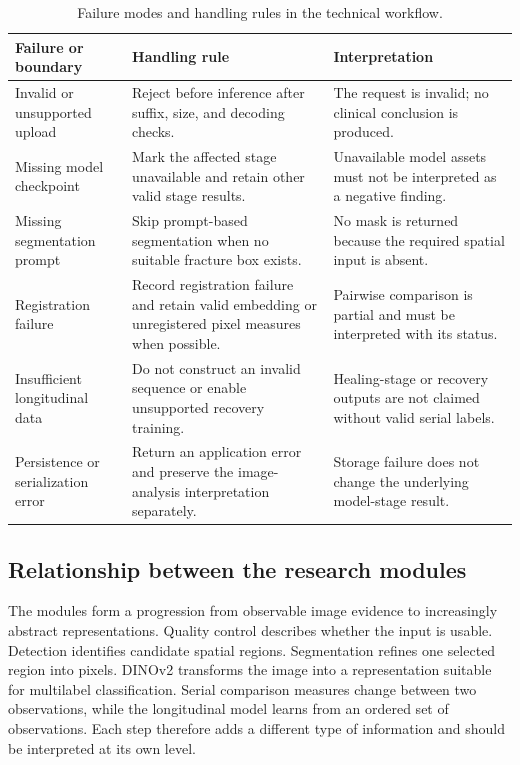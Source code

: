 \documentclass[12pt,a4paper]{article}
\begin{document}
\begin{table}[H]
\centering
\small
\caption{Failure modes and handling rules in the technical workflow.}
\label{tab:failure-handling}
\begin{tabularx}{\textwidth}{|p{}|p{}|X|}
\hline
\textbf{Failure or boundary} & \textbf{Handling rule} & \textbf{Interpretation}\\\hline
Invalid or unsupported upload & Reject before inference after suffix, size, and decoding checks. & The request is invalid; no clinical conclusion is produced.\\\hline
Missing model checkpoint & Mark the affected stage unavailable and retain other valid stage results. & Unavailable model assets must not be interpreted as a negative finding.\\\hline
Missing segmentation prompt & Skip prompt-based segmentation when no suitable fracture box exists. & No mask is returned because the required spatial input is absent.\\\hline
Registration failure & Record registration failure and retain valid embedding or unregistered pixel measures when possible. & Pairwise comparison is partial and must be interpreted with its status.\\\hline
Insufficient longitudinal data & Do not construct an invalid sequence or enable unsupported recovery training. & Healing-stage or recovery outputs are not claimed without valid serial labels.\\\hline
Persistence or serialization error & Return an application error and preserve the image-analysis interpretation separately. & Storage failure does not change the underlying model-stage result.\\\hline
\end{tabularx}
\end{table}

\subsection{Relationship between the research modules}
The modules form a progression from observable image evidence to increasingly abstract representations. Quality control describes whether the input is usable. Detection identifies candidate spatial regions. Segmentation refines one selected region into pixels. DINOv2 transforms the image into a representation suitable for multilabel classification. Serial comparison measures change between two observations, while the longitudinal model learns from an ordered set of observations. Each step therefore adds a different type of information and should be interpreted at its own level.
\end{document}

